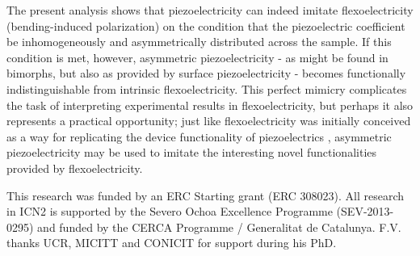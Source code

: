 \documentclass[%
 aps,prl,showpacs,
 amsmath,amssymb,
 reprint,%
]{revtex4-1}
\begin{document}
The present analysis shows that piezoelectricity can indeed imitate flexoelectricity (bending-induced polarization)
on the condition that the piezoelectric coefficient be inhomogeneously and asymmetrically distributed across the sample. 
If this condition is met, however, asymmetric piezoelectricity - as might be found in bimorphs, but also as provided by surface piezoelectricity \cite{ref:Tagantsev2012,ref:Stengel2014,ref:Narvaez2015} - becomes 
functionally indistinguishable from intrinsic flexoelectricity. 
This perfect mimicry complicates the task of interpreting experimental results in flexoelectricity, but perhaps it also represents a practical opportunity; 
just like flexoelectricity was initially conceived as a way for replicating the device functionality of piezoelectrics \cite{ref:Zhu2006,ref:Fu2007,ref:Chu2009}, 
asymmetric piezoelectricity may be used to imitate the interesting novel functionalities \cite{ref:Lu2012,STARKOV201665,Cordero2017,Yangeaan3256} provided by flexoelectricity.



This research was funded by an ERC Starting grant (ERC 308023). 
All research in ICN2 is supported by the Severo Ochoa Excellence Programme (SEV-2013-0295) 
and funded by the CERCA Programme / Generalitat de Catalunya. F.V. thanks UCR, MICITT and CONICIT for support during his PhD. 


\end{document}
